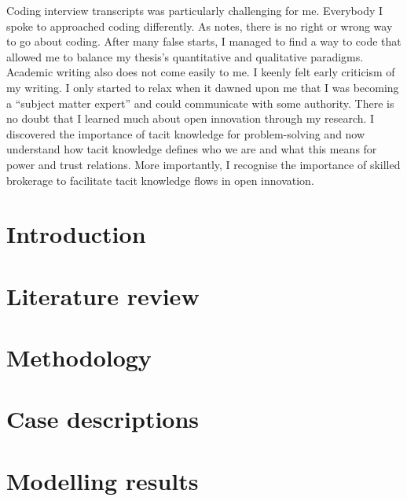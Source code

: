 \documentclass[12pt,table,xcdraw]{book}
\begin{document}
Coding interview transcripts was particularly challenging for me. Everybody I spoke to approached coding differently. As \citet{saldana2015coding} notes, there is no right or wrong way to go about coding. After many false starts, I managed to find a way to code that allowed me to balance my thesis's quantitative and qualitative paradigms. Academic writing also does not come easily to me. I keenly felt early criticism of my writing. I only started to relax when it dawned upon me that I was becoming a \enquote{subject matter expert} and could communicate with some authority. There is no doubt that I learned much about open innovation through my research. I discovered the importance of tacit knowledge for problem-solving and now understand how tacit knowledge defines who we are and what this means for power and trust relations. More importantly, I recognise the importance of skilled brokerage to facilitate tacit knowledge flows in open innovation. 

\newpage
\setcounter{tocdepth}{3}
\tableofcontents

\newpage

\listoffigures

\newpage

\listoftables

\mainmatter

\chapter{Introduction} \label{chp:intro}


\chapter{Literature review} \label{chp:lit_review}


\chapter{Methodology} \label{chp:methodology}


\chapter{Case descriptions} \label{chp:case_overview}


\chapter{Modelling results} \label{chp:ergm_result}

%
\end{document}
